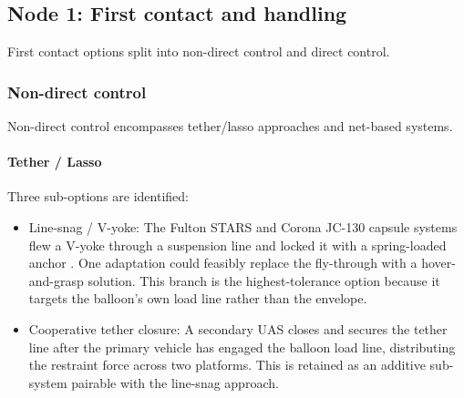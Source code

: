 \subsection{Node 1: First contact and handling}

First contact options split into non-direct control and direct control.
\vspace{-10pt}
\subsubsection*{Non-direct control}

Non-direct control encompasses tether/lasso approaches and net-based systems.
\vspace{-10pt}

\paragraph{Tether / Lasso}
Three sub-options are identified:
\vspace{-8pt}

\begin{itemize}[leftmargin=*]

    \item Line-snag / V-yoke: The Fulton STARS and Corona JC-130 capsule systems flew a V-yoke through a suspension line and locked it with a spring-loaded anchor \cite{Killianetal}. One adaptation could feasibly replace the fly-through with a hover-and-grasp solution. This branch is the highest-tolerance option because it targets the balloon's own load line rather than the envelope.

    \item Cooperative tether closure: A secondary UAS closes and secures the tether line after the primary vehicle has engaged the balloon load line, distributing the restraint force across two platforms. This is retained as an additive sub-system pairable with the line-snag approach.



\end{itemize}
\vspace{-20pt}

